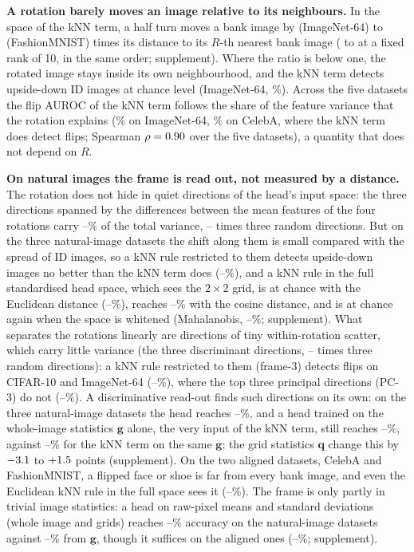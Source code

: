 \documentclass{article}
\begin{document}
\textbf{A rotation barely moves an image relative to its neighbours.} In the space of the kNN term, a half turn moves a bank image by \ratioIN{} (ImageNet-64) to \ratioFM{} (FashionMNIST) times its distance to its $R$-th nearest bank image (\ratioRtenIN{} to \ratioRtenFM{} at a fixed rank of 10, in the same order; supplement). Where the ratio is below one, the rotated image stays inside its own neighbourhood, and the kNN term detects upside-down ID images at chance level (ImageNet-64, \vfINknn\%). Across the five datasets the flip AUROC of the kNN term follows the share of the feature variance that the rotation explains (\btotIN\% on ImageNet-64, \btotMax\% on CelebA, where the kNN term does detect flips; Spearman $\rho=0.90$ over the five datasets), a quantity that does not depend on $R$.

\textbf{On natural images the frame is read out, not measured by a distance.} The rotation does not hide in quiet directions of the head's input space: the three directions spanned by the differences between the mean features of the four rotations carry \mthreeShareMin--\mthreeShareMax\% of the total variance, \mthreeRandMin--\mthreeRandMax{} times three random directions. But on the three natural-image datasets the shift along them is small compared with the spread of ID images, so a kNN rule restricted to them detects upside-down images no better than the kNN term does (\mthreeVfNatMin--\mthreeVfNatMax\%), and a kNN rule in the full standardised head space, which sees the $2\times2$ grid, is at chance with the Euclidean distance (\fullVfNatMin--\fullVfNatMax\%), reaches \fullCosVfNatMin--\fullCosVfNatMax\% with the cosine distance, and is at chance again when the space is whitened (Mahalanobis, \whVfNatMin--\whVfNatMax\%; supplement). What separates the rotations linearly are directions of tiny within-rotation scatter, which carry little variance (the three discriminant directions, \varLdaMin--\varLdaAllMax{} times three random directions): a kNN rule restricted to them (frame-3) detects flips on CIFAR-10 and ImageNet-64 (\vfLdaHardMin--\vfLdaHardMax\%), where the top three principal directions (PC-3) do not (\vfPcHardMin--\vfPcHardMax\%). A discriminative read-out finds such directions on its own: on the three natural-image datasets the head reaches \headVfNatMin--\headVfNatMax\%, and a head trained on the whole-image statistics $\mathbf{g}$ alone, the very input of the kNN term, still reaches \gVfNatMin--\gVfNatMax\%, against \knnVfNatMin--\knnVfNatMax\% for the kNN term on the same $\mathbf{g}$; the grid statistics $\mathbf{q}$ change this by $-3.1$ to $+1.5$ points (supplement). On the two aligned datasets, CelebA and FashionMNIST, a flipped face or shoe is far from every bank image, and even the Euclidean kNN rule in the full space sees it (\fullVfAliMin--\fullVfAliMax\%). The frame is only partly in trivial image statistics: a head on raw-pixel means and standard deviations (whole image and grids) reaches \pixAccNatMin--\pixAccNatMax\% accuracy on the natural-image datasets against \gAccNatMin--\gAccNatMax\% from $\mathbf{g}$, though it suffices on the aligned ones (\pixAccAliMin--\pixAccAliMax\%; supplement).
\end{document}
